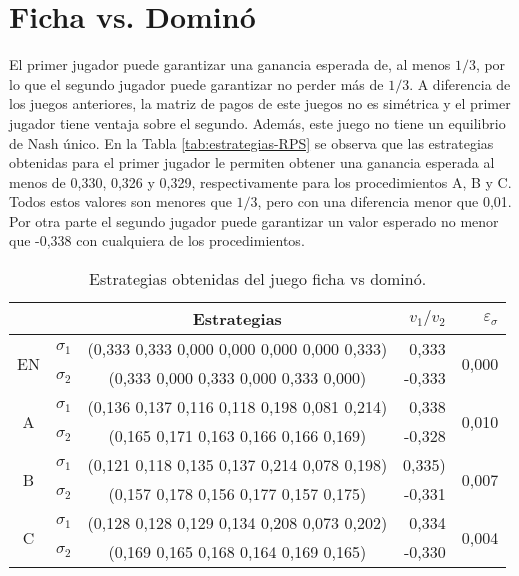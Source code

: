 \section*{Ficha vs. Dominó}

El primer jugador puede garantizar una ganancia esperada de, al menos $1/3$, por lo que el segundo jugador puede garantizar no perder más de $1/3$. A diferencia de los juegos anteriores, la matriz de pagos de este juegos no es simétrica y el primer jugador tiene ventaja sobre el segundo. Además, este juego no tiene un equilibrio de Nash único. En la Tabla \ref{tab:estrategias-RPS} se observa que las estrategias obtenidas para el primer jugador le permiten obtener una ganancia esperada al menos de 0,330, 0,326 y 0,329, respectivamente para los procedimientos A, B y C. Todos estos valores son menores que $1/3$, pero con una diferencia menor que 0,01. Por otra parte el segundo jugador puede garantizar un valor esperado no menor que -0,338 con cualquiera de los procedimientos.

\begin{table}[h]
    \centering
    \caption{Estrategias obtenidas del juego ficha vs dominó.}
    \label{tab:estrategias-domino}
    \begin{tabular}{c c c r r}
        \toprule
        & & Estrategias & $v_1 / v_2$ & $\varepsilon_{\sigma}$ \\
        \midrule
        \multirow{2}{*}{EN}
        & $\sigma_1$ & (0,333 0,333 0,000 0,000 0,000 0,000 0,333) & 0,333 & \multirow{2}{*}{0,000}\\
        & $\sigma_2$ & (0,333 0,000 0,333 0,000 0,333 0,000) &  -0,333 & \\
        \midrule
        \multirow{2}{*}{A}
        & $\sigma_1$ & (0,136 0,137 0,116 0,118 0,198 0,081 0,214) & 0,338 &\multirow{2}{*}{0,010} \\
        & $\sigma_2$ & (0,165 0,171 0,163 0,166 0,166 0,169) & -0,328 &\\
        \midrule
        \multirow{2}{*}{B}
        & $\sigma_1$ & (0,121 0,118 0,135 0,137 0,214 0,078 0,198) & 0,335) & \multirow{2}{*}{0,007} \\
        & $\sigma_2$ & (0,157 0,178 0,156 0,177 0,157 0,175) & -0,331 & \\
        \midrule
        \multirow{2}{*}{C}
        & $\sigma_1$ & (0,128 0,128 0,129 0,134 0,208 0,073 0,202) & 0,334 & \multirow{2}{*}{0,004} \\
        & $\sigma_2$ & (0,169 0,165 0,168 0,164 0,169 0,165) & -0,330 & \\
        \bottomrule
    \end{tabular}
\end{table}

